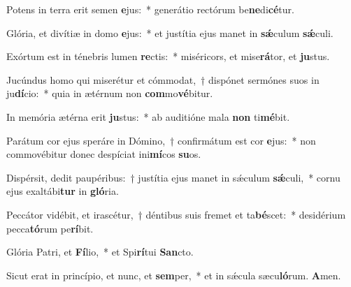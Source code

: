 ﻿\item Potens in terra erit semen \textbf{e}jus:~* generátio rectórum be\textbf{ne}di\textbf{cé}tur.

\item Glória, et divítiæ in domo \textbf{e}jus:~* et justítia ejus manet in \textbf{sǽ}culum \textbf{sǽ}culi.

\item Exórtum est in ténebris lumen \textbf{re}ctis:~* miséricors, et mise\textbf{rá}tor, et \textbf{ju}stus.

\item Jucúndus homo qui miserétur et cómmodat,~† dispónet sermónes suos in ju\textbf{dí}cio:~* quia in ætérnum non \textbf{com}mo\textbf{vé}bitur.

\item In memória ætérna erit \textbf{ju}stus:~* ab auditióne mala \textbf{non} ti\textbf{mé}bit.

\item Parátum cor ejus speráre in Dómino,~† confirmátum est cor \textbf{e}jus:~* non commovébitur donec despíciat ini\textbf{mí}cos \textbf{su}os.

\item Dispérsit, dedit paupéribus:~† justítia ejus manet in sǽculum \textbf{sǽ}culi,~* cornu ejus exaltábi\textbf{tur} in \textbf{gló}ria.

\item Peccátor vidébit, et irascétur,~† déntibus suis fremet et ta\textbf{bé}scet:~* desidérium pecca\textbf{tó}rum pe\textbf{rí}bit.

\item Glória Patri, et \textbf{Fí}lio,~* et Spi\textbf{rí}tui \textbf{San}cto.

\item Sicut erat in princípio, et nunc, et \textbf{sem}per,~* et in sǽcula sæcu\textbf{ló}rum. \textbf{A}men.
